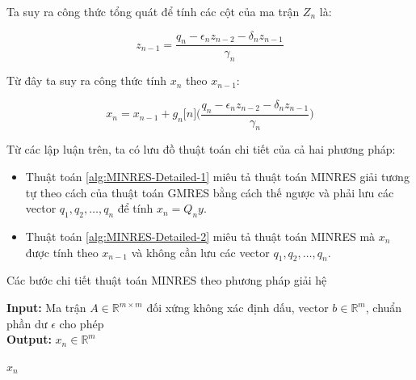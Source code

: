\documentclass[14pt, a4paper]{article}
\numberwithin{equation}{section}
\numberwithin{algorithm}{section}
\numberwithin{figure}{section}
\numberwithin{dl}{section}
\numberwithin{md}{section}
\numberwithin{bd}{section}
\numberwithin{dn}{section}
\begin{document}
Ta suy ra công thức tổng quát để tính các cột của ma trận $Z_n$ là:

\begin{equation}
	z_{n-1} = \dfrac{q_n - \epsilon_n z_{n-2} - \delta_n z_{n-1}}{\gamma_n}
\end{equation}

Từ đây ta suy ra công thức tính $x_n$ theo $x_{n-1}$:

\begin{equation}
    x_n = x_{n-1} + g_n\lbrack n \rbrack \Big(\dfrac{q_n - \epsilon_n z_{n-2} - \delta_n z_{n-1}}{\gamma_n}\Big)
\end{equation}

Từ các lập luận trên, ta có lưu đồ thuật toán chi tiết của cả hai phương pháp:

\begin{itemize}
    \item Thuật toán \ref{alg:MINRES-Detailed-1} miêu tả thuật toán MINRES giải tương tự theo cách của thuật toán GMRES bằng cách thế ngược và phải lưu các vector $q_1, q_2, \dots, q_n$ để tính $x_n = Q_n y$.
    \item Thuật toán \ref{alg:MINRES-Detailed-2} miêu tả thuật toán MINRES mà $x_n$ được tính theo $x_{n-1}$ và không cần lưu các vector $q_1, q_2, \dots, q_n$.
\end{itemize}

\begin{algorithm}[h!]
    \caption{Các bước chi tiết thuật toán MINRES theo phương pháp giải hệ}\label{alg:MINRES-Detailed-1}
    \hspace*{\algorithmicindent} \textbf{Input:} {Ma trận $A \in \mathbb{R}^{m \times m}$ đối xứng không xác định dấu, vector $b \in \mathbb{R}^m$, chuẩn phần dư $\epsilon$ cho phép} \\
    \hspace*{\algorithmicindent} \textbf{Output:} {$x_n \in \mathbb{R}^m$}
    \begin{algorithmic}
                \State \Return $x_n$
            \EndIf
        \EndFor
    \end{algorithmic}
\end{algorithm}
\end{document}
